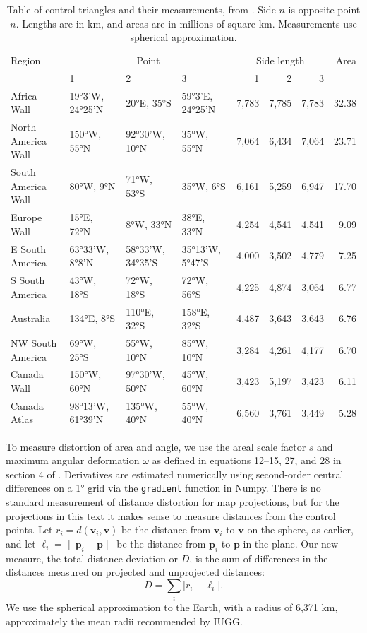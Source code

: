 \documentclass[]{interact}
\begin{document}
\begin{table}
\begin{tabular}{ p{2.5cm} | p{1.3cm} p{1.3cm} p{1.4cm} | r r r | r }
Region & \multicolumn{3}{c}{Point} &
  \multicolumn{3}{c}{Side length} &  Area \\
& 1 & 2 & 3 & 1 & 2 & 3 & \\
\hline
Africa Wall & 19°3'W, 24°25'N & 20°E, 35°S & 59°3'E, 24°25'N &
  7,783 & 7,785 & 7,783 & 32.38 \\
North \mbox{America} Wall & 150°W, 55°N & 92°30'W, 10°N & 35°W, 55°N &
  7,064 & 6,434 & 7,064 & 23.71 \\
South \mbox{America} Wall & 80°W, 9°N & 71°W, 53°S & 35°W, 6°S &
  6,161 & 5,259 & 6,947 & 17.70 \\
Europe Wall & 15°E, 72°N & 8°W, 33°N & 38°E, 33°N &
  4,254 & 4,541 & 4,541 & 9.09 \\
E South \mbox{America} & 63°33'W, 8°8'N & 58°33'W, 34°35'S & 35°13'W, 5°47'S &
  4,000 & 3,502 & 4,779 & 7.25 \\
S South \mbox{America} & 43°W, 18°S & 72°W, 18°S & 72°W, 56°S &
  4,225 & 4,874 & 3,064 & 6.77 \\
Australia & 134°E, 8°S & 110°E, 32°S & 158°E, 32°S &
  4,487 & 3,643 & 3,643 & 6.76 \\
NW South \mbox{America} & 69°W, 25°S & 55°W, 10°N & 85°W, 10°N &
  3,284 & 4,261 & 4,177 & 6.70 \\
Canada Wall & 150°W, 60°N & 97°30'W, 50°N & 45°W, 60°N &
  3,423 & 5,197 & 3,423 & 6.11 \\
Canada \mbox{Atlas} & 98°13'W, 61°39'N & 135°W, 40°N & 55°W, 40°N &
  6,560 & 3,761 & 3,449 & 5.28
\end{tabular}
\caption{Table of control triangles and their measurements, from
\citet{christensen}. Side $n$ is opposite point $n$. Lengths are in km,
and areas are in millions of square km.
Measurements use spherical approximation.}
\label{table:ctrlpts}
\end{table}

To measure distortion of area and angle, we use the areal scale factor $s$ and
maximum angular deformation $\omega$ as defined in equations 12--15, 27, and 28
in section 4 of \citet{snyder87}. Derivatives are estimated numerically using
second-order central differences on a 1° grid %
via the \texttt{gradient} function in Numpy. \citep{numpy} There is no standard
measurement of distance distortion for map projections, but for the projections
in this text it makes sense to measure distances from the control points. Let
$r_i = d(\mathbf v_i, \mathbf v)$ be the distance from $\mathbf v_i$ to
$\mathbf v$ on the sphere, as earlier, and let
$\ell_i = \|\mathbf p_i - \mathbf p\|$ be the distance from $\mathbf p_i$ to
$\mathbf p$ in the plane.
Our new measure, the total distance deviation or $D$, is the sum of
differences in the distances measured on projected and unprojected distances:
\begin{equation}
 D = \sum_i \left| r_i - \ell_i \right|.
\end{equation}
We use the spherical approximation to the Earth, with a radius of 6,371 km,
approximately the mean radii recommended by IUGG. \citep{moritz}
\end{document}
